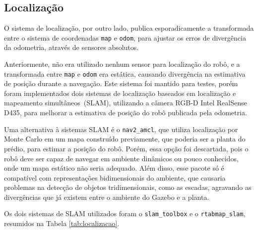 \documentclass[repeatfields,xlists,xpacks,oneside,yearsonly]{ufrgscca}
\begin{document}
\subsection{Localização}
\label{met:localizacao}

O sistema de localização, por outro lado, publica esporadicamente a
transformada entre o sistema de coordenadas \texttt{map} e
\texttt{odom}, para ajustar os erros de divergência da odometria,
através de sensores absolutos.

Anteriormente, não era utilizado nenhum sensor para localização do
robô, e a transformada entre \texttt{map} e \texttt{odom} era
estática, causando divergência na estimativa de posição durante a
navegação. Este sistema foi mantido para testes, porém foram
implementados dois sistemas de localização baseados em localização e
mapeamento simultâneos~(SLAM), utilizando a câmera RGB-D Intel
RealSense D435, para melhorar a estimativa de posição do robô
publicada pela odometria.

Uma alternativa à sistemas SLAM é o \texttt{nav2\_amcl}, que utiliza
localização por Monte Carlo em um mapa construído previamente, que
poderia ser a planta do prédio, para estimar a posição do robô.
Porém, essa opção foi descartada, pois o robô deve ser capaz de
navegar em ambiente dinâmicos ou pouco conhecidos, onde um mapa
estático não seria adequado. Além disso, esse pacote só é compatível
com representações bidimensionais do ambiente, que causaria problemas
na detecção de objetos tridimensionais, como as escadas, agravando as
divergências que já existem entre o ambiente do Gazebo e a planta.

Os dois sistemas de SLAM utilizados foram o \texttt{slam\_toolbox} e
o \texttt{rtabmap\_slam}, resumidos na Tabela \ref{tab:localizacao}.
\end{document}
